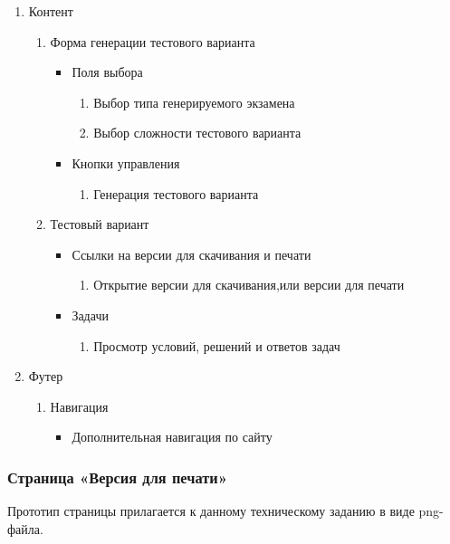 \begin{enumerate}
	\item Контент
	\begin{enumerate}
		\item Форма генерации тестового варианта
		\begin{itemize}
		\item Поля выбора
		\begin{enumerate}
			\item Выбор типа генерируемого экзамена
			\item Выбор сложности тестового варианта
		\end{enumerate}
		\item Кнопки управления
		\begin{enumerate}
			\item Генерация тестового варианта
		\end{enumerate}
		\end{itemize}

		\item Тестовый вариант
		\begin{itemize}
		\item Ссылки на версии для скачивания и печати
		\begin{enumerate}
			\item Открытие версии для скачивания,или версии для печати
		\end{enumerate}
		\item Задачи
		\begin{enumerate}
			\item Просмотр условий, решений и ответов задач
		\end{enumerate}
		\end{itemize}
	\end{enumerate}

	\item Футер
	\begin{enumerate}
		\item Навигация
		\begin{itemize}
			\item Дополнительная навигация по сайту
		\end{itemize}
	\end{enumerate}
\end{enumerate}


\subsubsection{Страница «Версия для печати»}

Прототип страницы прилагается к данному техническому заданию в виде png-файла.

